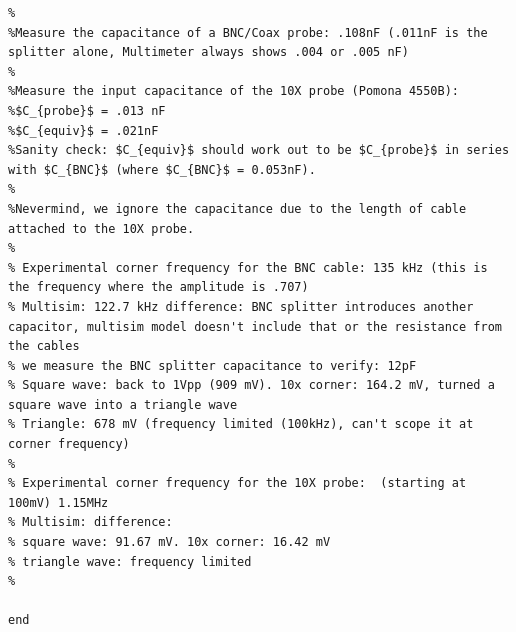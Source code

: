 \documentclass[12pt,letterpaper]{report}
\begin{document}
\begin{verbatim}
%
%Measure the capacitance of a BNC/Coax probe: .108nF (.011nF is the splitter alone, Multimeter always shows .004 or .005 nF)
%
%Measure the input capacitance of the 10X probe (Pomona 4550B): 
%$C_{probe}$ = .013 nF
%$C_{equiv}$ = .021nF
%Sanity check: $C_{equiv}$ should work out to be $C_{probe}$ in series with $C_{BNC}$ (where $C_{BNC}$ = 0.053nF). 
%
%Nevermind, we ignore the capacitance due to the length of cable attached to the 10X probe.
%
% Experimental corner frequency for the BNC cable: 135 kHz (this is the frequency where the amplitude is .707)
% Multisim: 122.7 kHz difference: BNC splitter introduces another capacitor, multisim model doesn't include that or the resistance from the cables
% we measure the BNC splitter capacitance to verify: 12pF 
% Square wave: back to 1Vpp (909 mV). 10x corner: 164.2 mV, turned a square wave into a triangle wave
% Triangle: 678 mV (frequency limited (100kHz), can't scope it at corner frequency)
%
% Experimental corner frequency for the 10X probe:  (starting at 100mV) 1.15MHz
% Multisim: difference:
% square wave: 91.67 mV. 10x corner: 16.42 mV
% triangle wave: frequency limited
%

end
\end{verbatim}
\end{document}
